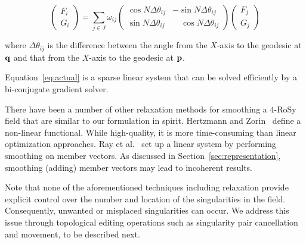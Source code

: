 \documentclass{acmsiggraph}               %
\begin{document}
\begin{equation}
\begin{pmatrix} F_i \\ G_i \end{pmatrix} = \sum_{j \in J} \omega_{ij}
\begin{pmatrix} \cos N\Delta\theta_{ij} & -\sin N\Delta\theta_{ij} \\ \sin
N\Delta\theta_{ij} & \quad \cos N\Delta\theta_{ij} \end{pmatrix}
\begin{pmatrix} F_j \\ G_j \end{pmatrix} \label{eq:actual}
\end{equation}

\noindent where $\Delta\theta_{ij}$ is the difference between the
angle from the $X$-axis to the geodesic at ${\bf q}$ and that from
the $X$-axis to the geodesic at ${\bf p}$. %
%

Equation~\ref{eq:actual} is a sparse linear system that can be
solved efficiently by a bi-conjugate gradient solver.

There have been a number of other relaxation methods for smoothing a
$4$-RoSy field that are similar to our formulation in spirit.
Hertzmann and Zorin~ define a non-linear
functional. While high-quality, it is more time-consuming than
linear optimization approaches. Ray et al.~ set up
a linear system by performing smoothing on member vectors. As
discussed in Section~\ref{sec:representation}, smoothing (adding)
member vectors may lead to incoherent results.

Note that none of the aforementioned techniques including relaxation
provide explicit control over the number and location of the
singularities in the field. Consequently, unwanted or misplaced
singularities can occur. We address this issue through topological
editing operations such as singularity pair cancellation and
movement, to be described next.
\end{document}
